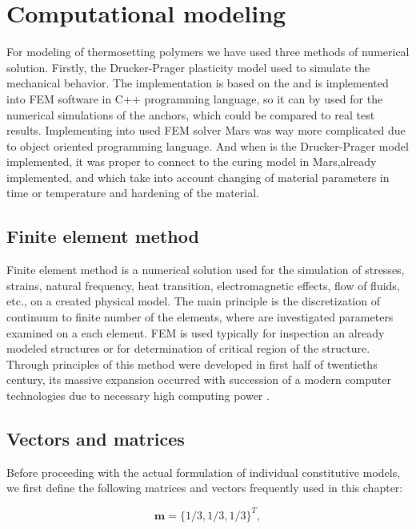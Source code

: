 \section{Computational modeling}
\indent

For modeling of thermosetting polymers we have used three methods of numerical solution. Firstly, the Drucker-Prager plasticity model used to simulate the mechanical behavior. The implementation is based on the \cite{geofem} and is implemented into FEM software in C++ programming language, so it can by used for the numerical simulations of the anchors, which could be compared to real test results. Implementing into used FEM solver Mars \cite{mars} was way more complicated due to object oriented programming language. And when is the Drucker-Prager model implemented, it was proper to connect to the  curing model in Mars,already implemented, and which take into account changing of material parameters in time or temperature and hardening of the material.

\subsection{Finite element method}
\indent

Finite element method is a numerical solution used for the simulation of stresses, strains, natural frequency, heat transition, electromagnetic effects, flow of fluids, etc., on a created physical model. The main principle is the discretization of continuum to finite number of the elements, where are investigated parameters examined on a each element. FEM is used typically for inspection an already modeled structures or for determination of critical region of the structure. Through principles of this method were developed in first half of twentieths century, its massive expansion occurred with succession of a modern computer technologies due to necessary high computing power \cite{dhatt2012finite}. 
\newpage
\subsection{Vectors and matrices}
\indent

Before proceeding with the actual formulation of individual constitutive models, we first define the following matrices and vectors frequently used in this chapter:

\begin{equation}
	\boldsymbol{m} = \lbrace 1/3,1/3,1/3\rbrace ^T,
\end{equation}


